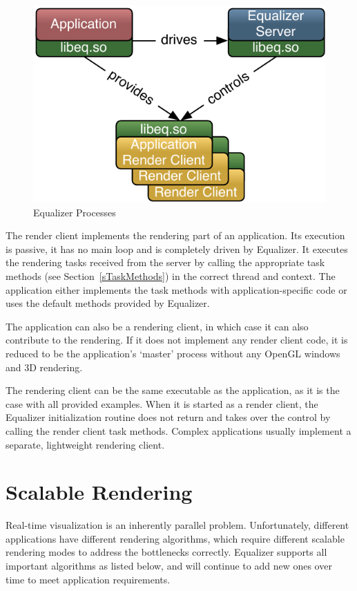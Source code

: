 \documentclass[10pt,a4]{scrartcl}
\newcommand{\sref}[1]{Section~\ref{#1}}
\begin{document}
\begin{figure}
  \includegraphics[width=.618\textwidth]{images/processes.pdf}
  {\caption{\label{fProcesses}Equalizer Processes}}
\end{figure}
The render client implements the rendering part of an application. Its
execution is passive, it has no main loop and is completely driven by
Equalizer. It executes the rendering tasks received from the server by
calling the appropriate task methods (see \sref{sTaskMethods}) in the
correct thread and context. The application either implements the task
methods with application-specific code or uses the default methods
provided by Equalizer.

The application can also be a rendering client, in which case it can
also contribute to the rendering. If it does not implement any render
client code, it is reduced to be the application's `master' process
without any OpenGL windows and 3D rendering.

The rendering client can be the same executable as the application, as
it is the case with all provided examples. When it is started as a
render client, the Equalizer initialization routine does not return and
takes over the control by calling the render client task
methods. Complex applications usually implement a separate, lightweight
rendering client.


\section{Scalable Rendering}

Real-time visualization is an inherently parallel
problem. Unfortunately, different applications have different rendering
algorithms, which require different scalable rendering modes to address
the bottlenecks correctly. Equalizer supports all important algorithms as
listed below, and will continue to add new ones over time to meet
application requirements.
\end{document}
